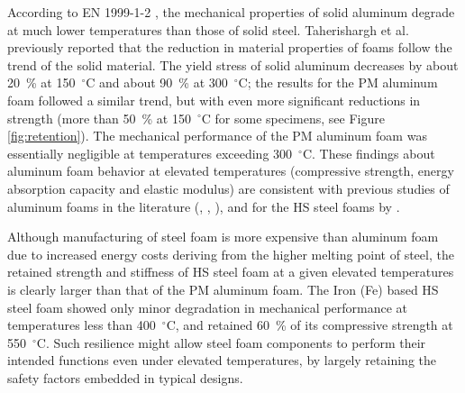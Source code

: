\documentclass[review]{elsarticle}
\begin{document}
According to EN 1999-1-2 \cite{EC9-1-2}, the mechanical properties of solid aluminum degrade at much lower temperatures than those of solid steel. Taherishargh et al. \cite{Taherishargh2018} previously reported that the reduction in material properties of foams follow the trend of the solid material. The yield stress of solid aluminum decreases by about 20~\% at 150~$^\circ\mathrm{C}$ and about 90~\% at 300~$^\circ\mathrm{C}$; the results for the PM aluminum foam followed a similar trend, but with even more significant reductions in strength (more than 50~\% at 150~$^\circ\mathrm{C}$ for some specimens, see Figure  \ref{fig:retention}). The mechanical performance of the PM aluminum foam was essentially negligible at temperatures exceeding 300~$^\circ\mathrm{C}$. These findings about aluminum foam behavior at elevated temperatures (compressive strength, energy absorption capacity and elastic modulus) are consistent with previous studies of aluminum foams in the literature (\cite{Aly2007}, \cite{Kovacicetal2016}, \cite{Liuetal2016}), and for the HS steel foams by \cite{BekozOktay2014}.

Although manufacturing of steel foam is more expensive than aluminum foam due to increased energy costs deriving from the higher melting point of steel, the retained strength and stiffness of HS steel foam at a given elevated temperatures is clearly larger than that of the PM aluminum foam. The Iron (Fe) based HS steel foam showed only minor degradation in mechanical performance at temperatures less than 400~$^\circ\mathrm{C}$, and retained 60~\% of its compressive strength at 550~$^\circ\mathrm{C}$. Such resilience might allow steel foam components to perform their intended functions even under elevated temperatures, by largely retaining the safety factors embedded in typical designs.
\end{document}
